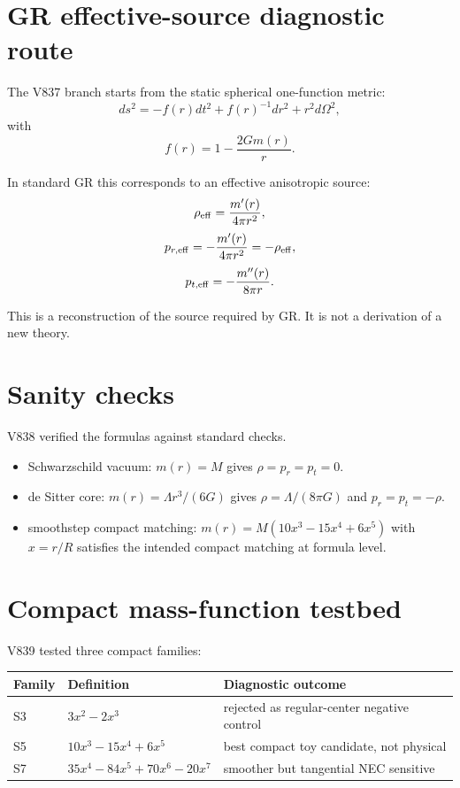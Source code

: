 \documentclass[11pt,a4paper]{article}
\begin{document}
\section{GR effective-source diagnostic route}

The V837 branch starts from the static spherical one-function metric:
\begin{equation}
ds^2=-f(r)dt^2+f(r)^{-1}dr^2+r^2d\Omega^2,
\end{equation}
with
\begin{equation}
f(r)=1-\frac{2Gm(r)}{r}.
\end{equation}

In standard GR this corresponds to an effective anisotropic source:
\begin{equation}
\rho_{\rm eff}=\frac{m'(r)}{4\pi r^2},
\end{equation}
\begin{equation}
p_{r,\rm eff}=-\frac{m'(r)}{4\pi r^2}=-\rho_{\rm eff},
\end{equation}
\begin{equation}
p_{t,\rm eff}=-\frac{m''(r)}{8\pi r}.
\end{equation}

This is a reconstruction of the source required by GR. It is not a derivation of a new theory.

\section{Sanity checks}

V838 verified the formulas against standard checks.

\begin{itemize}
\item Schwarzschild vacuum: $m(r)=M$ gives $\rho=p_r=p_t=0$.
\item de Sitter core: $m(r)=\Lambda r^3/(6G)$ gives $\rho=\Lambda/(8\pi G)$ and $p_r=p_t=-\rho$.
\item smoothstep compact matching: $m(r)=M(10x^3-15x^4+6x^5)$ with $x=r/R$ satisfies the intended compact matching at formula level.
\end{itemize}

\section{Compact mass-function testbed}

V839 tested three compact families:

\begin{center}
\begin{tabular}{lll}
\toprule
Family & Definition & Diagnostic outcome \\
\midrule
S3 & $3x^2-2x^3$ & rejected as regular-center negative control \\
S5 & $10x^3-15x^4+6x^5$ & best compact toy candidate, not physical \\
S7 & $35x^4-84x^5+70x^6-20x^7$ & smoother but tangential NEC sensitive \\
\bottomrule
\end{tabular}
\end{center}
\end{document}
